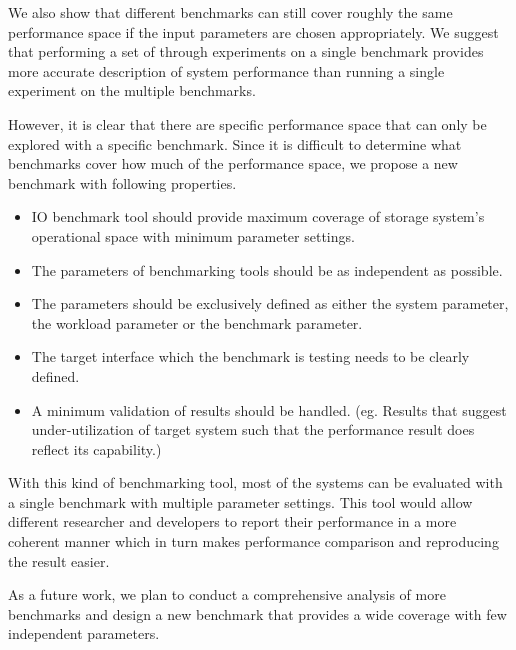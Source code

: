 We also show that different benchmarks can still cover roughly the same performance space if the input parameters are chosen appropriately. We suggest that performing a set of through experiments on a single benchmark provides more accurate description of system performance than running a single experiment on the multiple benchmarks. 

However, it is clear that there are specific performance space that can only be explored with a specific benchmark. Since it is difficult to determine what benchmarks cover how much of the performance space, we propose a new benchmark with following properties.
\begin{itemize}
\item IO benchmark tool should provide maximum coverage of storage system's operational space with minimum parameter settings.  
\item The parameters of benchmarking tools should be as independent as possible.
\item The parameters should be exclusively defined as either the system parameter, the workload parameter or the benchmark parameter. 
\item The target interface which the benchmark is testing needs to be clearly defined. 
\item A minimum validation of results should be handled. (eg. Results that suggest under-utilization of target system such that the performance result does reflect its capability.)
\end{itemize}

With this kind of benchmarking tool, most of the systems can be evaluated with a single benchmark with multiple parameter settings. This tool would allow different researcher and developers to report their performance in a more coherent manner which in turn makes performance comparison and reproducing the result easier. 

As a future work, we plan to conduct a comprehensive analysis of more benchmarks and design a new benchmark that provides a wide coverage with few independent parameters. 

